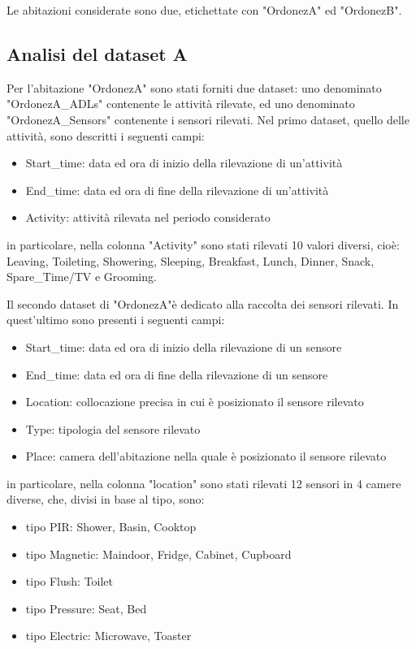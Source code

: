 \documentclass[10pt,a4paper]{article}
\begin{document}
Le abitazioni considerate sono due, etichettate con "OrdonezA" ed "OrdonezB".
\subsection{Analisi del dataset A}
Per l'abitazione "OrdonezA" sono stati forniti due dataset: uno denominato "OrdonezA\_ADLs" contenente le attività rilevate, ed uno denominato "OrdonezA\_Sensors" contenente i sensori rilevati.
Nel primo dataset, quello delle attività, sono descritti i seguenti campi:
\begin{itemize}
	\item Start\_time: data ed ora di inizio della rilevazione di un'attività
	\item End\_time: data ed ora di fine della rilevazione di un'attività
	\item  Activity: attività rilevata nel periodo considerato
\end{itemize}

in particolare, nella colonna "Activity" sono stati rilevati 10 valori diversi, cioè: Leaving, Toileting, Showering, Sleeping, Breakfast, Lunch, Dinner, Snack, Spare\_Time/TV e Grooming. 

Il secondo dataset di "OrdonezA"è dedicato alla raccolta dei sensori rilevati. In quest'ultimo sono presenti i seguenti campi:
\begin{itemize}
	\item Start\_time: data ed ora di inizio della rilevazione di un sensore
	\item End\_time: data ed ora di fine della rilevazione di un sensore
	\item  Location: collocazione precisa in cui è posizionato il sensore rilevato
	\item Type: tipologia del sensore rilevato
	\item Place: camera dell'abitazione nella quale è posizionato il sensore rilevato
\end{itemize}

in particolare, nella colonna "location" sono stati rilevati 12 sensori in 4 camere diverse, che, divisi in base al tipo, sono:

\begin{itemize}
	\item tipo PIR: Shower, Basin, Cooktop
	\item tipo Magnetic: Maindoor, Fridge, Cabinet, Cupboard
	\item  tipo Flush: Toilet
	\item tipo Pressure: Seat, Bed
	\item tipo Electric: Microwave, Toaster
\end{itemize}
\end{document}
